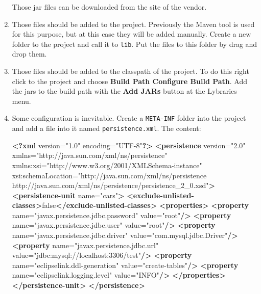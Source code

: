 \documentclass[]{report}
\newenvironment{Shaded}{}{}
\newcommand{\KeywordTok}[1]{\textcolor[rgb]{0.00,0.44,0.13}{\textbf{{#1}}}}
\newcommand{\StringTok}[1]{\textcolor[rgb]{0.25,0.44,0.63}{{#1}}}
\newcommand{\OtherTok}[1]{\textcolor[rgb]{0.00,0.44,0.13}{{#1}}}
\newcommand{\NormalTok}[1]{{#1}}
\begin{document}
\begin{enumerate}
  Those jar files can be downloaded from the site of the vendor.
\item
  Those files should be added to the project. Previously the Maven tool
  is used for this purpose, but at this case they will be added
  manually. Create a new folder to the project and call it to
  \texttt{lib}. Put the files to this folder by drag and drop them.
\item
  Those files should be added to the classpath of the project. To do
  this right click to the project and choose \textbf{Build Path
  \textbar{} Configure Build Path}. Add the jars to the build path with
  the \textbf{Add JARs} button at the Lybraries menu.
\item
  Some configuration is inevitable. Create a \texttt{META-INF} folder
  into the project and add a file into it named
  \texttt{persistence.xml}. The content:

\begin{Shaded}
\begin{Highlighting}[]
\KeywordTok{<?xml} \NormalTok{version="1.0" encoding="UTF-8"}\KeywordTok{?>}
\KeywordTok{<persistence}\OtherTok{ version=}\StringTok{"2.0"}
\OtherTok{  xmlns=}\StringTok{"http://java.sun.com/xml/ns/persistence"}
\OtherTok{  xmlns:xsi=}\StringTok{"http://www.w3.org/2001/XMLSchema-instance"}
\OtherTok{  xsi:schemaLocation=}\StringTok{"http://java.sun.com/xml/ns/persistence http://java.sun.com/xml/ns/persistence/persistence_2_0.xsd"}\KeywordTok{>}
  \KeywordTok{<persistence-unit}\OtherTok{ name=}\StringTok{"cars"}\KeywordTok{>}
    \KeywordTok{<exclude-unlisted-classes>}\NormalTok{false}\KeywordTok{</exclude-unlisted-classes>}
    \KeywordTok{<properties>}
      \KeywordTok{<property}\OtherTok{ name=}\StringTok{"javax.persistence.jdbc.password"}\OtherTok{ value=}\StringTok{"root"}\KeywordTok{/>}
      \KeywordTok{<property}\OtherTok{ name=}\StringTok{"javax.persistence.jdbc.user"}\OtherTok{ value=}\StringTok{"root"}\KeywordTok{/>}
      \KeywordTok{<property}\OtherTok{ name=}\StringTok{"javax.persistence.jdbc.driver"}\OtherTok{ value=}\StringTok{"com.mysql.jdbc.Driver"}\KeywordTok{/>}
      \KeywordTok{<property}\OtherTok{ name=}\StringTok{"javax.persistence.jdbc.url"}\OtherTok{ value=}\StringTok{"jdbc:mysql://localhost:3306/test"}\KeywordTok{/>}
      \KeywordTok{<property}\OtherTok{ name=}\StringTok{"eclipselink.ddl-generation"}\OtherTok{ value=}\StringTok{"create-tables"}\KeywordTok{/>}
      \KeywordTok{<property}\OtherTok{ name=}\StringTok{"eclipselink.logging.level"}\OtherTok{ value=}\StringTok{"INFO"}\KeywordTok{/>}
    \KeywordTok{</properties>}
  \KeywordTok{</persistence-unit>}
\KeywordTok{</persistence>}
\end{Highlighting}
\end{Shaded}


\end{enumerate}
\end{document}
